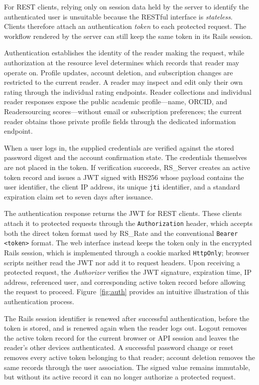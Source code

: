 \documentclass[a4paper, english]{article}
\newcommand{\rsserver}{RS\_Server\xspace}
\newcommand{\rsrate}{RS\_Rate\xspace}
\begin{document}
For REST clients, relying only on session data held by the server to identify the authenticated user is unsuitable because the RESTful interface is \emph{stateless}. Clients therefore attach an authentication \emph{token} to each protected request. The workflow rendered by the server can still keep the same token in its Rails session.

Authentication establishes the identity of the reader making the request, while authorization at the resource level determines which records that reader may operate on. Profile updates, account deletion, and subscription changes are restricted to the current reader. A reader may inspect and edit only their own rating through the individual rating endpoints. Reader collections and individual reader responses expose the public academic profile---name, ORCID, and Readersourcing scores---without email or subscription preferences; the current reader obtains those private profile fields through the dedicated information endpoint.

When a user logs in, the supplied credentials are verified against the stored password digest and the account confirmation state. The credentials themselves are not placed in the token. If verification succeeds, \rsserver creates an active token record and issues a JWT signed with HS256 whose payload contains the user identifier, the client IP address, its unique \verb|jti| identifier, and a standard expiration claim set to seven days after issuance.

The authentication response returns the JWT for REST clients. These clients attach it to protected requests through the \verb|Authorization| header, which accepts both the direct token format used by \rsrate and the conventional \verb|Bearer <token>| format. The web interface instead keeps the token only in the encrypted Rails session, which is implemented through a cookie marked \verb|HttpOnly|; browser scripts neither read the JWT nor add it to request headers. Upon receiving a protected request, the \emph{Authorizer} verifies the JWT signature, expiration time, IP address, referenced user, and corresponding active token record before allowing the request to proceed. Figure~\ref{fig:auth} provides an intuitive illustration of this authentication process.

The Rails session identifier is renewed after successful authentication, before the token is stored, and is renewed again when the reader logs out. Logout removes the active token record for the current browser or API session and leaves the reader's other devices authenticated. A successful password change or reset removes every active token belonging to that reader; account deletion removes the same records through the user association. The signed value remains immutable, but without its active record it can no longer authorize a protected request.
\end{document}
